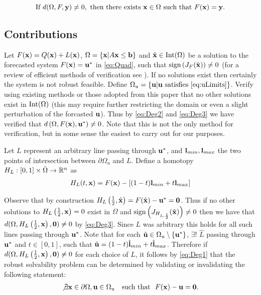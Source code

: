 \begin{equation}\label{eq:Deg2}
\text{If }d(\Omega,F,\mathbf{y})\neq 0,\text{ then there exists }\mathbf{x}\in\Omega\text{ such that }F(\mathbf{x})=\mathbf{y}. 
\end{equation}

\subsection{Contributions}
Let $F(\mathbf{x})=Q(\mathbf{x})+L(\mathbf{x})$, $\Omega=\{\mathbf{x}| A\mathbf{x} \leq \mathbf{b}\}$ and $\hat{\mathbf{x}}\in \operatorname{Int}(\Omega)$ be a solution to the forecasted system $F(\mathbf{x})=\mathbf{u}^*$ in \ref{eq:Quad}, such that $\operatorname{sign}\left(J_{F}(\hat{\mathbf{x}})\right)\neq 0$ (for a review of efficient methods of verification see \cite{GRIEWANK2014}). 
If no solutions exist then certainly the system is not robust feasible. Define $\Omega_u=\{\mathbf{u}| \mathbf{u}\text{ satisfies }\ref{eq:uLimits}\}$.
Verify using existing methods or those adopted from this paper that no other solutions exist in $\operatorname{Int}(\Omega)$ (this may require further restricting the domain or even a slight perturbation of the forcasted $\mathbf{u}$). 
Thus by \ref{eq:Deg2} and \ref{eq:Deg3} we have verified that $d\left(\Omega, F(\mathbf{x}), \mathbf{u}^*\right)\neq 0$. 
Note that this is not the only method for verification, but in some sense the easiest to carry out for our purposes. 

Let $L$ represent an arbitrary line passing through $\mathbf{u}^*$, and $\mathbf{l}_{min},\mathbf{l}_{max}$ the two points of intersection between $\partial\Omega_u$ and $L$. 
Define a homotopy $H_L : [0,1]\times\bar{\Omega}\rightarrow\mathbb{R}^n$ as 
\begin{align}
H_L(t,\mathbf{x}) = F(\mathbf{x})-\left[(1-t)\mathbf{l}_{min}+t\mathbf{l}_{max}\right] \label{eq:Homo}
\end{align}

Observe that by construction $H_L\left(\frac{1}{2},\hat{\mathbf{x}}\right)=F(\hat{\mathbf{x}})-\mathbf{u}^*=\textbf{0}$. 
Thus if no other solutions to $H_L\left(\frac{1}{2},\mathbf{x}\right)=0$ exist in $\Omega$ and $\operatorname{sign}\left(J_{H_{L,\frac{1}{2}}}(\hat{\mathbf{x}})\right)\neq 0$ then we have that $d(\Omega,H_L\left(\frac{1}{2},\mathbf{x}\right),\textbf{0})\neq 0$ by \ref{eq:Deg3}. 
Since $L$ was arbitrary this holds for all such lines passing through $\mathbf{u}^*$.
Note that for each $\hat{\mathbf{u}}\in\Omega_u\setminus\{\mathbf{u}^*\}$, $\exists !$ $\hat{L}$ passing through $\mathbf{u}^*$ and $t\in[0,1]$,  such that $\hat{\mathbf{u}}=(1-t)\hat{\mathbf{l}}_{min}+t\hat{\mathbf{l}}_{max}$. 
Therefore if $d(\Omega,H_L\left(\frac{1}{2},\mathbf{x}\right),\mathbf{0})\neq 0$ for each choice of $L$, it follows by \ref{eq:Deg1} that the robust solvability problem can be determined by validating or invalidating the following statement:
\begin{align}
\not\exists \mathbf{x}\in\partial\Omega, \mathbf{u}\in\Omega_u \ \ \mbox{ such that } \ F(\mathbf{x})-\mathbf{u}=\mathbf{0}. \label{eq:RSForm}
\end{align}


